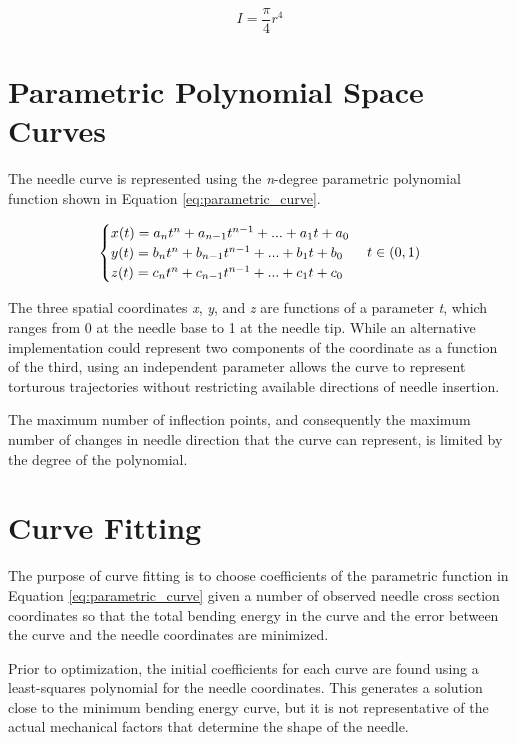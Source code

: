 \begin{equation}
\label{eq:beam_inertia}
I = \frac{\pi}{4}r^4
\end{equation}

\section{Parametric Polynomial Space Curves}
The needle curve is represented using the \textit{n}-degree parametric polynomial function shown in Equation \ref{eq:parametric_curve}. 

\begin{equation}
\label{eq:parametric_curve}
\begin{cases} x(t) = a_n t^n + a_{n-1} t^{n-1} + ... + a_1 t + a_0 \\
 y(t) = b_n t^n + b_{n-1} t^{n-1} + ... + b_1 t + b_0  \\
 z(t) = c_n t^n + c_{n-1} t^{n-1} + ... + c_1 t + c_0 \end{cases} \\
 t\in (0, 1)
 \end{equation}

The three spatial coordinates \textit{x}, \textit{y}, and \textit{z} are functions of a parameter \textit{t}, which ranges from 0 at the needle base to 1 at the needle tip. While an alternative implementation could represent two components of the coordinate as a function of the third, using an independent parameter allows the curve to represent torturous trajectories without restricting available directions of needle insertion.

The maximum number of inflection points, and consequently the maximum number of changes in needle direction that the curve can represent, is limited by the degree of the polynomial.

\section{Curve Fitting}
The purpose of curve fitting is to choose coefficients of the parametric function in Equation \ref{eq:parametric_curve} given a number of observed needle cross section coordinates so that the total bending energy in the curve and the error between the curve and the needle coordinates are minimized.

Prior to optimization, the initial coefficients for each curve are found using a least-squares polynomial for the needle coordinates. This generates a solution close to the minimum bending energy curve, but it is not representative of the actual mechanical factors that determine the shape of the needle.

